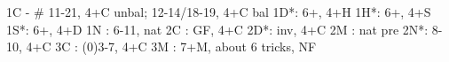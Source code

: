 1C -  # 11-21, 4+C unbal; 12-14/18-19, 4+C bal
1D*: 6+, 4+H
1H*: 6+, 4+S
1S*: 6+, 4+D
1N : 6-11, nat
2C : GF, 4+C
2D*: inv, 4+C
2M : nat pre
2N*: 8-10, 4+C
3C : (0)3-7, 4+C
3M : 7+M, about 6 tricks, NF